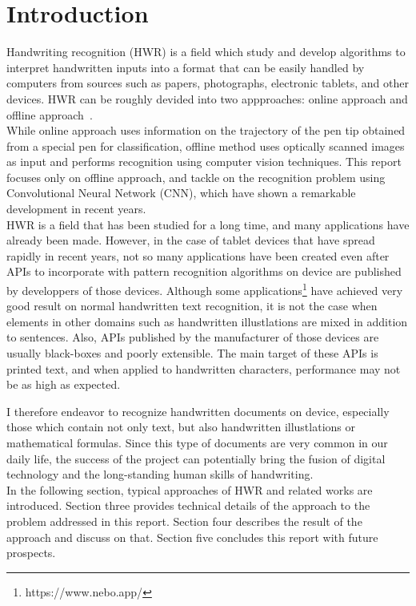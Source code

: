 \section{Introduction}

Handwriting recognition (HWR) is a field which study and develop algorithms to
interpret handwritten inputs into a format that can be easily handled by computers
from sources such as papers, photographs, electronic tablets, and other devices.
HWR can be roughly devided into two appproaches:
online approach and offline approach~\cite{plamondon2000online}.\\
While online approach uses information on the trajectory of the pen tip
obtained from a special pen for classification, offline method uses
optically scanned images as input and performs recognition using computer vision techniques.
This report focuses only on offline approach, and tackle on the recognition problem
using Convolutional Neural Network (CNN), which have shown a remarkable development in recent years.\\

HWR is a field that has been studied for a long time, and many applications have already been made.
However, in the case of tablet devices that have spread rapidly in recent years, not so many applications
have been created even after APIs to incorporate with pattern recognition algorithms on device are published
by developpers of those devices. Although some applications\footnote{https://www.nebo.app/} have achieved very good
result on normal handwritten text recognition, it is not the case when elements in other domains
such as handwritten illustlations are mixed in addition to sentences.
Also, APIs published by the manufacturer of those devices are usually black-boxes and poorly extensible.
The main target of these APIs is printed text, and when applied to handwritten characters,
performance may not be as high as expected.

I therefore endeavor to recognize handwritten documents on device, especially those which contain not only text,
but also handwritten illustlations or mathematical formulas. Since this type of documents are very common
in our daily life, the success of the project can potentially bring the fusion of digital
technology and the long-standing human skills of handwriting. \\

In the following section, typical approaches of HWR and related works are introduced.
Section three provides technical details of the approach to the problem addressed in
this report. Section four describes the result of the approach and discuss on that.
Section five concludes this report with future prospects.\\
